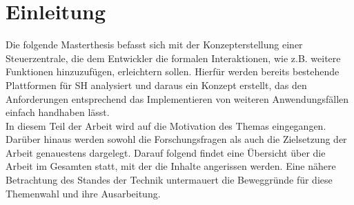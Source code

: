 \chapter{Einleitung}
\label{chap:Einleitung}
    Die folgende Masterthesis befasst sich mit der Konzepterstellung einer Steuerzentrale, die 
    dem Entwickler die formalen Interaktionen, wie z.B. weitere Funktionen hinzuzufügen, erleichtern sollen. Hierfür werden
    bereits bestehende Plattformen für \acl{SH} analysiert und daraus ein Konzept erstellt, das den Anforderungen 
    entsprechend das Implementieren von weiteren Anwendungsfällen einfach handhaben lässt. 
    \\
    \linebreak
    In diesem Teil der Arbeit wird auf die Motivation des Themas eingegangen. Darüber hinaus 
    werden sowohl die Forschungsfragen als auch die Zielsetzung der Arbeit genauestens dargelegt. Darauf 
    folgend findet eine Übersicht über die Arbeit im Gesamten statt, mit der die Inhalte angerissen werden. 
    Eine nähere Betrachtung des Standes der Technik untermauert die Beweggründe für diese Themenwahl und 
    ihre Ausarbeitung. 

